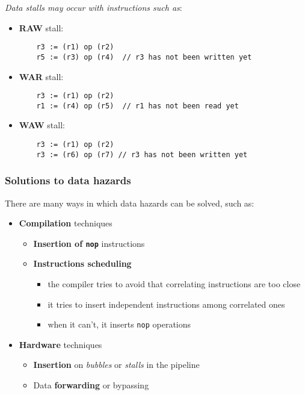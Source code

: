 \documentclass[english]{article}
\begin{document}
\bigskip
\textit{Data stalls may occur with instructions such as}:
\begin{itemize}
  \item \textbf{RAW} stall:
        \begin{verbatim}
    r3 := (r1) op (r2)
    r5 := (r3) op (r4)  // r3 has not been written yet\end{verbatim}

  \item \textbf{WAR} stall:
        \begin{verbatim}
    r3 := (r1) op (r2)
    r1 := (r4) op (r5)  // r1 has not been read yet \end{verbatim}
  \item \textbf{WAW} stall:
        \begin{verbatim}
    r3 := (r1) op (r2)
    r3 := (r6) op (r7) // r3 has not been written yet \end{verbatim}
\end{itemize}

\subsubsection{Solutions to data hazards}

There are many ways in which data hazards can be solved, such as:

\begin{itemize}
  \item \textbf{Compilation} techniques
        \begin{itemize}
          \item \textbf{Insertion of \texttt{nop}} instructions
          \item \textbf{Instructions scheduling}
                \begin{itemize}
                  \item the compiler tries to avoid that correlating instructions are too close
                  \item it tries to insert independent instructions among correlated ones
                  \item when it can't, it inserts \texttt{nop} operations
                \end{itemize}
        \end{itemize}
  \item \textbf{Hardware} techniques
        \begin{itemize}
          \item \textbf{Insertion} on \textit{bubbles} or \textit{stalls} in the pipeline
          \item Data \textbf{forwarding} or bypassing
        \end{itemize}
\end{itemize}
\end{document}
